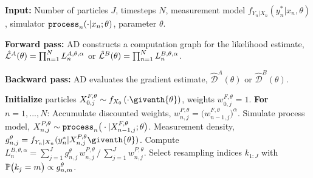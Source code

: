 \documentclass[numsec,webpdf,modern,medium,namedate]{oup-authoring-template}
\begin{document}
\begin{algorithm}[htbp!]
	\caption{DMOP-$\alpha$}
    \label{alg:dmop}
	     \textbf{Input:} Number of particles $J$, timesteps $N$, measurement model $f_{Y_n|X_n}(y_n^*|x_n, \theta)$, simulator $\texttt{process}_n(\cdot|x_n; \theta)$, parameter $\theta$.
      
             \textbf{Forward pass:} AD constructs a computation graph for the likelihood estimate, $\hat{\mathcal{L}}^A(\theta) = \prod_{n=1}^N L_n^{A,\theta,\alpha}$ or $\hat{\mathcal{L}}^B(\theta) = \prod_{n=1}^N L_n^{B,\theta,\alpha}$. 
            
        \textbf{Backward pass:} AD evaluates the gradient estimate, $\hat{\mathcal{D}}^A(\theta)$ or  $\hat{\mathcal{D}}^B(\theta)$.
            
		\textbf{Initialize } particles ${X}_{0,j}^{F,\theta}\sim {f}_{{X}_{0}}\left(\cdot\giventh{\theta}\right)$, weights $w^{F,\theta}_{0,j}= 1$. \newline
		\textbf{For} $n=1,...,N$: \newline
            \hspace*{4mm} Accumulate discounted weights, $w_{n,j}^{P,\theta} = \big(w_{n-1,j}^{F,\theta}\big)^\alpha$.\newline
            \hspace*{4mm} Simulate process model,
            ${X}_{n,j}^{P,\theta}\sim \texttt{process}_n\big(\cdot|{X}_{n-1,j}^{F, \theta};{\theta}\big)$. \newline
            \hspace*{4mm} Measurement density,
            $g^{\theta}_{n,j}={f}_{{Y}_{n}|{X}_{n}}(y_{n}^{*}|{X}_{n,j}^{P,\theta}\giventh{\theta})$. \newline
            \hspace*{4mm} Compute $L_n^{B,\theta,\alpha} ={\sum_{j=1}^Jg^\theta_{n,j} \, w^{P,\theta}_{n,j}}\, \big/\, {\sum_{j=1}^J  w^{P,\theta}_{n,j}}$. \newline
            \hspace*{4mm} Select resampling indices $k_{1:J}$ with $\mathbb{P}\big(k_{j}=m\big) \propto g^{\theta}_{n,m}$. \newline

\end{algorithm}
\end{document}
